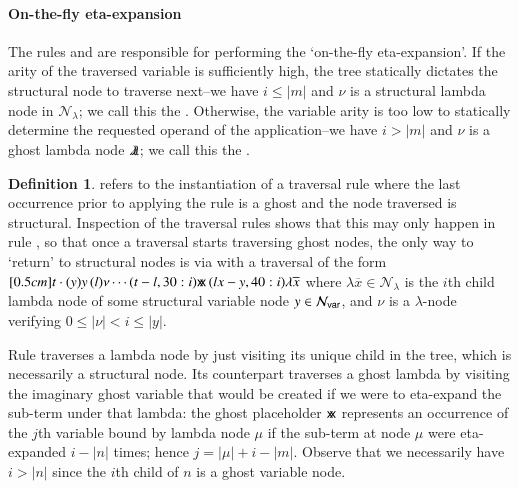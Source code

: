 \documentclass{elsarticle}
\theoremstyle{plain}
\theoremstyle{definition}
\newtheorem{definition}{Definition}[section]
\newcommand\Nodes{\mathcal{N}}%
\newcommand\NodesVar{\Nodes_{\sf var}}%
\newcommand\NodesLmd{\Nodes_\lambda}%
\newcommand{\ghostlmd}{{\lambda\mkern-7mu \lambda}}
\newcommand{\ghostvar}{\mathsf{x\mkern-5mu x}}
\begin{document}
\paragraph{On-the-fly eta-expansion}
The rules  and  are responsible for
performing the `on-the-fly eta-expansion'.
If the arity of the traversed variable is sufficiently high, the tree statically dictates the structural node to traverse next--we have $i \leq |m|$ and $\nu$ is a structural lambda node in $\NodesLmd$; we call this the . Otherwise, the variable arity is too low to statically determine the requested operand of the application--we have $i > |m|$ and $\nu$ is a ghost lambda node $\ghostlmd$; we call this the .

\begin{definition}
     refers to the instantiation of a traversal rule where the last occurrence prior to applying the rule is a ghost
    and the node traversed is structural.
    Inspection of the traversal rules shows that this may only happen in rule , so that once a traversal starts traversing ghost nodes, the only way to `return' to structural nodes is via  with a traversal of the form
    $
    \Pstr[0.5cm]{ t \cdot (y){y} \, (l){\nu}  \cdots (t-l,30:i){\ghostvar}
        \, (lx-y,40:i){\lambda \overline{x}}}
    $
    where
     $\lambda \overline{x} \in \NodesLmd$ is the $i$th child lambda node of some structural variable node $y \in \NodesVar$,
     and $\nu$ is a $\lambda$-node verifying $0\leq |\nu| < i \leq |y|$.
\end{definition}

Rule  traverses a lambda node by just visiting its unique child  in the tree, which is necessarily a structural node. Its counterpart \rulenamet{Lam^\ghostvar} traverses a ghost lambda by visiting the imaginary ghost variable that would be created if we were to eta-expand the sub-term under that lambda: the ghost placeholder $\ghostvar$ represents an occurrence of the $j$th variable bound by lambda node $\mu$ if the sub-term at node $\mu$ were eta-expanded $i-|n|$ times; hence $j = |\mu| + i - |m|$.
Observe that we necessarily have $i>|n|$ since the $i$th child of $n$ is a ghost variable node.
\end{document}
